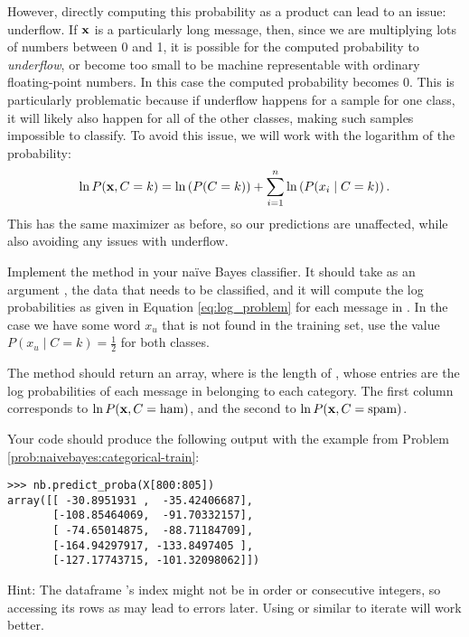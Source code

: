However, directly computing this probability as a product can lead to an issue: underflow.
If $\mathbf{x}$ is a particularly long message, then, since we are multiplying lots of numbers between 0 and 1, it is possible for the computed probability to \emph{underflow}, or become too small to be machine representable with ordinary floating-point numbers.
In this case the computed probability becomes 0.
This is particularly problematic because if underflow happens for a sample for one class, it will likely also happen for all of the other classes, making such samples impossible to classify.
To avoid this issue, we will work with the logarithm of the probability:
\begin{equation}\label{eq:log_problem}
    \ln P(\mathbf{x},C=k)=\ln\left(P(C=k)\right) + \sum_{i=1}^{n}\ln\left(P(x_i \mid C=k)\right).
\end{equation}
This has the same maximizer as before, so our predictions are unaffected, while also avoiding any issues with underflow.

\begin{problem}\label{NB:prob_predict_proba}
Implement the  method in your naïve Bayes classifier.
It should take as an argument , the data that needs to be classified, and it will compute the log probabilities as given in Equation \ref{eq:log_problem} for each message in .
In the case we have some word $x_u$ that is not found in the training set, use the value $P(x_u \mid C=k)=\frac{1}{2}$ for both classes.

The method should return an  array, where  is the length of , whose entries are the log probabilities of each message  in  belonging to each category.
The first column corresponds to $\ln P(\mathbf{x}, C=\text{ham})$, and the second to $\ln P(\mathbf{x}, C=\text{spam})$.

Your code should produce the following output with the example from Problem \ref{prob:naivebayes:categorical-train}:
\begin{lstlisting}
>>> nb.predict_proba(X[800:805])
array([[ -30.8951931 ,  -35.42406687],
       [-108.85464069,  -91.70332157],
       [ -74.65014875,  -88.71184709],
       [-164.94297917, -133.8497405 ],
       [-127.17743715, -101.32098062]])
\end{lstlisting}

Hint: The dataframe 's index might not be in order or consecutive integers, so accessing its rows as  may lead to errors later. Using  or similar to iterate will work better.
\end{problem}

